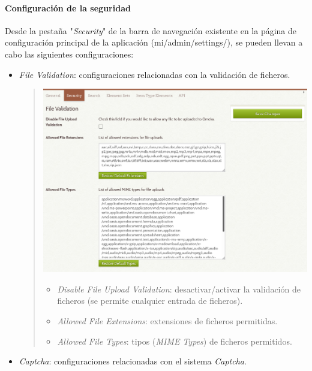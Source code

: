 \documentclass[
]{article}
\providecommand{\tightlist}{%
  \setlength{\itemsep}{0pt}\setlength{\parskip}{0pt}}
\begin{document}
\hypertarget{configuraciuxf3n-de-la-seguridad}{%
\paragraph{Configuración de la
seguridad}\label{configuraciuxf3n-de-la-seguridad}}

Desde la pestaña "\emph{Security}" de la barra de navegación existente
en la página de configuración principal de la aplicación
({mi/admin/settings/}), se pueden llevan a cabo las siguientes
configuraciones:

\begin{itemize}
\item
  \emph{File Validation}: configuraciones relacionadas con la validación
  de ficheros.

  \begin{quote}
  \includegraphics{../_static/images/sec-1.png}

  \begin{itemize}
  \tightlist
  \item
    \emph{Disable File Upload Validation}: desactivar/activar la
    validación de ficheros (se permite cualquier entrada de ficheros).
  \item
    \emph{Allowed File Extensions}: extensiones de ficheros permitidas.
  \item
    \emph{Allowed File Types}: tipos (\emph{MIME Types}) de ficheros
    permitidos.
  \end{itemize}
  \end{quote}
\item
  \emph{Captcha}: configuraciones relacionadas con el sistema
  \emph{Captcha}.


\end{itemize}
\end{document}
